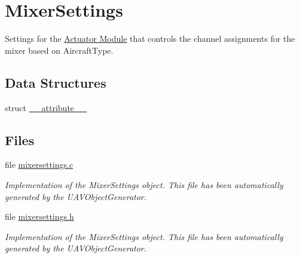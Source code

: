 \hypertarget{group___mixer_settings}{\section{\-Mixer\-Settings}
\label{group___mixer_settings}
}


\-Settings for the \hyperlink{group___actuator_module}{\-Actuator \-Module} that controls the channel assignments for the mixer based on \-Aircraft\-Type.  


\subsection*{\-Data \-Structures}
\begin{DoxyCompactItemize}
\item 
struct \hyperlink{struct____attribute____}{\-\_\-\-\_\-attribute\-\_\-\-\_\-}
\end{DoxyCompactItemize}
\subsection*{\-Files}
\begin{DoxyCompactItemize}
\item 
file \hyperlink{mixersettings_8c}{mixersettings.\-c}
\begin{DoxyCompactList}\small\item\em \-Implementation of the \-Mixer\-Settings object. \-This file has been automatically generated by the \-U\-A\-V\-Object\-Generator. \end{DoxyCompactList}\item 
file \hyperlink{mixersettings_8h}{mixersettings.\-h}
\begin{DoxyCompactList}\small\item\em \-Implementation of the \-Mixer\-Settings object. \-This file has been automatically generated by the \-U\-A\-V\-Object\-Generator. \end{DoxyCompactList}\end{DoxyCompactItemize}
